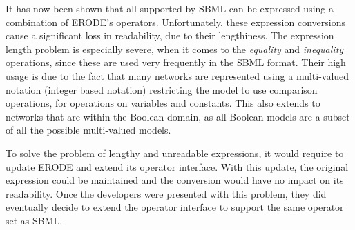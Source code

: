 It has now been shown that all supported by SBML can be expressed using a combination of ERODE's operators. Unfortunately, these expression conversions cause a significant loss in readability, due to their lengthiness. The expression length problem is especially severe, when it comes to the \emph{equality} and \emph{inequality} operations, since these are used very frequently in the SBML format. Their high usage is due to the fact that many networks are represented using a multi-valued notation (integer based notation) restricting the model to use comparison operations, for operations on variables and constants. This also extends to networks that are within the Boolean domain, as all Boolean models are a subset of all the possible multi-valued models.

To solve the problem of lengthy and unreadable expressions, it would require to update ERODE and extend its operator interface. With this update, the original expression could be maintained and the conversion would have no impact on its readability. Once the developers were presented with this problem, they did eventually decide to extend the operator interface to support the same operator set as SBML. 